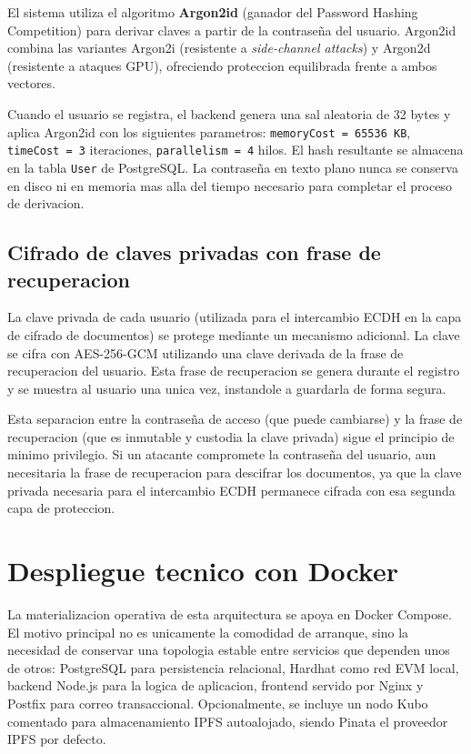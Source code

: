 \documentclass[11pt, a4paper]{article}
\begin{document}
El sistema utiliza el algoritmo \textbf{Argon2id} (ganador del Password Hashing Competition) para derivar claves a partir de la contraseña del usuario. Argon2id combina las variantes Argon2i (resistente a \textit{side-channel attacks}) y Argon2d (resistente a ataques GPU), ofreciendo proteccion equilibrada frente a ambos vectores.

Cuando el usuario se registra, el backend genera una sal aleatoria de 32 bytes y aplica Argon2id con los siguientes parametros: \texttt{memoryCost = 65536 KB}, \texttt{timeCost = 3} iteraciones, \texttt{parallelism = 4} hilos. El hash resultante se almacena en la tabla \texttt{User} de PostgreSQL. La contraseña en texto plano nunca se conserva en disco ni en memoria mas alla del tiempo necesario para completar el proceso de derivacion.

\subsection{Cifrado de claves privadas con frase de recuperacion}

La clave privada de cada usuario (utilizada para el intercambio ECDH en la capa de cifrado de documentos) se protege mediante un mecanismo adicional. La clave se cifra con AES-256-GCM utilizando una clave derivada de la frase de recuperacion del usuario. Esta frase de recuperacion se genera durante el registro y se muestra al usuario una unica vez, instandole a guardarla de forma segura.

Esta separacion entre la contraseña de acceso (que puede cambiarse) y la frase de recuperacion (que es inmutable y custodia la clave privada) sigue el principio de minimo privilegio. Si un atacante compromete la contraseña del usuario, aun necesitaria la frase de recuperacion para descifrar los documentos, ya que la clave privada necesaria para el intercambio ECDH permanece cifrada con esa segunda capa de proteccion.

\section{Despliegue tecnico con Docker}

La materializacion operativa de esta arquitectura se apoya en Docker Compose. El motivo principal no es unicamente la comodidad de arranque, sino la necesidad de conservar una topologia estable entre servicios que dependen unos de otros: PostgreSQL para persistencia relacional, Hardhat como red EVM local, backend Node.js para la logica de aplicacion, frontend servido por Nginx y Postfix para correo transaccional. Opcionalmente, se incluye un nodo Kubo comentado para almacenamiento IPFS autoalojado, siendo Pinata el proveedor IPFS por defecto.
\end{document}
